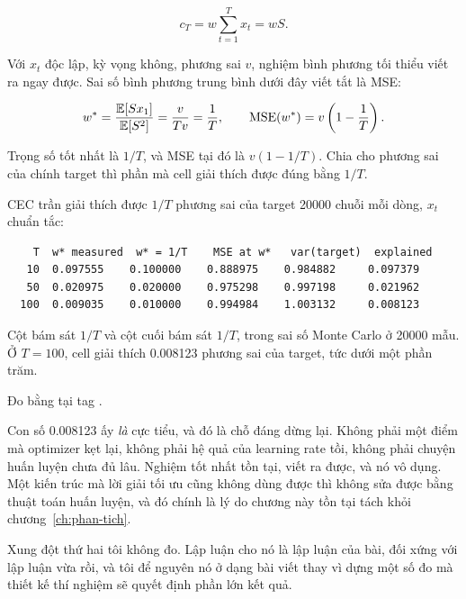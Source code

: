 \begin{equation}
  c_T = w \sum_{t=1}^{T} x_t = w S.
  \label{eq:ch04-cec-tran}
\end{equation}

Với \(x_t\) độc lập, kỳ vọng không, phương sai \(v\), nghiệm bình phương tối
thiểu viết ra ngay được. Sai số bình phương trung bình dưới đây viết tắt là
MSE:

\begin{equation}
  w^{*} = \frac{\mathbb{E}[S x_1]}{\mathbb{E}[S^2]} = \frac{v}{T v} = \frac{1}{T},
  \qquad
  \mathrm{MSE}(w^{*}) = v\left(1 - \frac{1}{T}\right).
  \label{eq:ch04-nghiem-toi-uu}
\end{equation}

Trọng số tốt nhất là \(1/T\), và MSE tại đó là \(v(1 - 1/T)\). Chia cho phương
sai của chính target thì phần mà cell giải thích được đúng bằng \(1/T\).

\begin{measured}{CEC trần giải thích được \(1/T\) phương sai của target}
20000 chuỗi mỗi dòng, \(x_t\) chuẩn tắc:

\begin{verbatim}
    T  w* measured  w* = 1/T    MSE at w*   var(target)  explained
   10  0.097555    0.100000    0.888975    0.984882     0.097379
   50  0.020975    0.020000    0.975298    0.997198     0.021962
  100  0.009035    0.010000    0.994984    1.003132     0.008123
\end{verbatim}

Cột  bám sát \(1/T\) và cột cuối bám sát \(1/T\), trong sai
số Monte Carlo ở 20000 mẫu. Ở \(T = 100\), cell giải thích 0.008123 phương sai
của target, tức dưới một phần trăm.

Đo bằng  tại tag .
\end{measured}

Con số 0.008123 ấy \emph{là} cực tiểu, và đó là chỗ đáng dừng lại. Không phải
một điểm mà optimizer kẹt lại, không phải hệ quả của learning rate tồi, không
phải chuyện huấn luyện chưa đủ lâu. Nghiệm tốt nhất tồn tại, viết ra được, và
nó vô dụng. Một kiến trúc mà lời giải tối ưu cũng không dùng được thì không sửa
được bằng thuật toán huấn luyện, và đó chính là lý do chương này tồn tại tách
khỏi chương~\ref{ch:phan-tich}.

Xung đột thứ hai tôi không đo. Lập luận cho nó là lập luận của bài, đối xứng
với lập luận vừa rồi, và tôi để nguyên nó ở dạng bài viết thay vì dựng một số
đo mà thiết kế thí nghiệm sẽ quyết định phần lớn kết quả.

